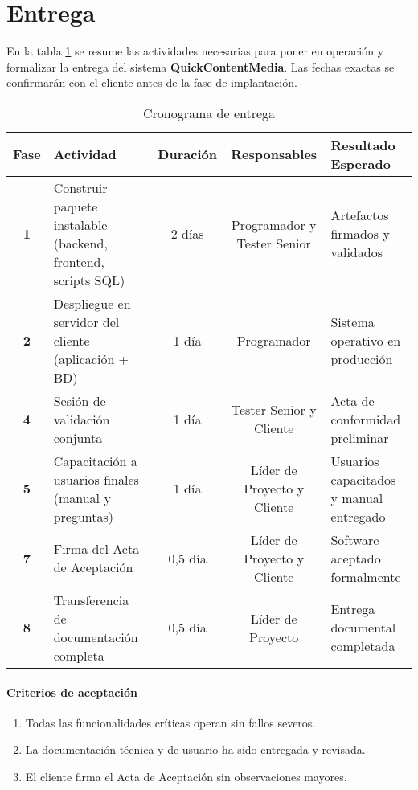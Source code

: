 \section{Entrega}
En la tabla \ref{tab:entrega} se resume las actividades
necesarias para poner en operación y formalizar la entrega del sistema
\textbf{QuickContentMedia}.  
Las fechas exactas se confirmarán con el cliente antes de la fase de
implantación.

\vspace{0.5cm}

\begin{table}[H]
\centering
\caption{Cronograma de entrega}
\label{tab:entrega}
\begin{tabularx}{\textwidth}{|c|X|c|c|X|}
\hline
\textbf{Fase} & \textbf{Actividad} & \textbf{Duración} & \textbf{Responsables} & \textbf{Resultado Esperado} \\ \hline
\textbf{1} & Construir paquete instalable (backend, frontend, scripts SQL) & 2 días & Programador y Tester Senior & Artefactos firmados y validados \\ \hline
\textbf{2} & Despliegue en servidor del cliente (aplicación + BD) & 1 día & Programador & Sistema operativo en producción \\ \hline
\textbf{4} & Sesión de validación conjunta & 1 día & Tester Senior y Cliente & Acta de conformidad preliminar \\ \hline
\textbf{5} & Capacitación a usuarios finales (manual y preguntas) & 1 día & Líder de Proyecto y Cliente & Usuarios capacitados y manual entregado \\ \hline
\textbf{7} & Firma del Acta de Aceptación & 0,5 día & Líder de Proyecto y Cliente & Software aceptado formalmente \\ \hline
\textbf{8} & Transferencia de documentación completa & 0,5 día & Líder de Proyecto & Entrega documental completada \\ \hline
\end{tabularx}
\end{table}

\vspace{0.5cm}

\paragraph{Criterios de aceptación}
\begin{enumerate}[label=\alph*)]
  \item Todas las funcionalidades críticas operan sin fallos severos.
  \item La documentación técnica y de usuario ha sido entregada y revisada.
  \item El cliente firma el Acta de Aceptación sin observaciones mayores.
\end{enumerate}


